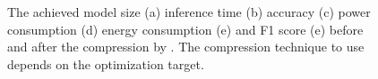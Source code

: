 \begin{figure}[!t]
\centering
{}
\hfill
{}
\hfill
{}
\hfill
{}
\hfill
{}
\hfill

\caption{The achieved model size (a) inference time (b) accuracy (c) power consumption (d) 
energy consumption (e) and F1 score (e) before and after the compression by \quantization.
The compression technique to use depends on the optimization target.}
\label{fig:analy_quan}
\end{figure}


